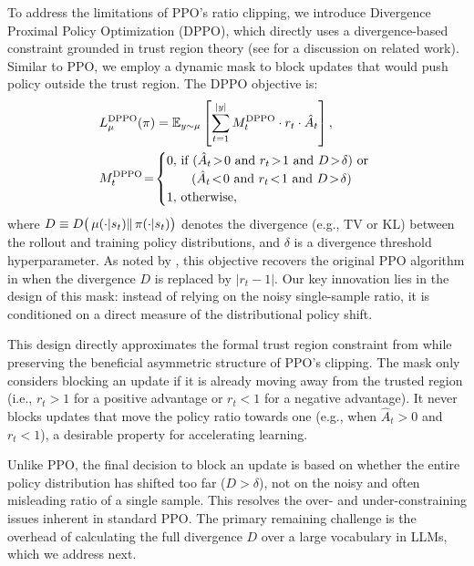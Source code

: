 To address the limitations of PPO's ratio clipping, we introduce Divergence Proximal Policy Optimization (DPPO), which directly uses a divergence-based constraint grounded in trust region theory (see  for a discussion on related work).  
Similar to PPO, we employ a dynamic mask to block updates that would push policy outside the trust region. The DPPO objective is:  
\begin{equation}  
\label{eq:dppo_obj}
\begin{split}
&L^{\mathrm{DPPO}}_{\rolloutpi}({\trainerpi}) = \mathbb{E}_{y \sim \rolloutpi} \left[ \sum_{t=1}^{|y|} M_t^{\mathrm{DPPO}} \cdot r_t \cdot \hat{A}_t \right],  \\
&M_t^{\mathrm{DPPO}} \!=\!  
	\begin{cases}  
		0, \!\!\!\! & \text{if } (\hat{A}_t \!>\! 0 \text{ and } r_t \!>\! 1 \text{ and } D \!>\! \delta) \text{ or } \\  
           & \;\;\; (\hat{A}_t \!<\! 0 \text{ and } r_t \!<\! 1 \text{ and } D \!>\! \delta) \\  
		1, \!\!\!\! & \text{otherwise},  
	\end{cases}  
\end{split}  
\end{equation}  
where $D \equiv D\big(\operatorname*{{\textcolor{black}{\mu}}}(\cdot| s_t) \| \operatorname*{{\textcolor{black}{\pi}}}(\cdot| s_t)\big)$ denotes the divergence (e.g., TV or KL) between the rollout and training policy distributions, and $\delta$ is a divergence threshold hyperparameter. As noted by \citet{chen2025minimax, zheng2025stabilizing}, this objective recovers the original PPO algorithm in  when the divergence $D$ is replaced by $|r_t - 1|$.  
Our key innovation lies in the design of this mask: instead of relying on the noisy single-sample ratio, it is conditioned on a direct measure of the distributional policy shift.

  
This design directly approximates the formal trust region constraint from  while preserving the beneficial asymmetric structure of PPO's clipping. The mask only considers blocking an update if it is already moving away from the trusted region (i.e., $r_t > 1$ for a positive advantage or $r_t < 1$ for a negative advantage). It never blocks updates that move the policy ratio towards one (e.g., when $\hat{A}_t > 0$ and $r_t < 1$), a desirable property for accelerating learning.  
  
Unlike PPO, the final decision to block an update is based on whether the entire policy distribution has shifted too far ($D > \delta$), not on the noisy and often misleading ratio of a single sample. This resolves the over- and under-constraining issues inherent in standard PPO. The primary remaining challenge is the overhead of calculating the full divergence $D$ over a large vocabulary in LLMs, which we address next.


